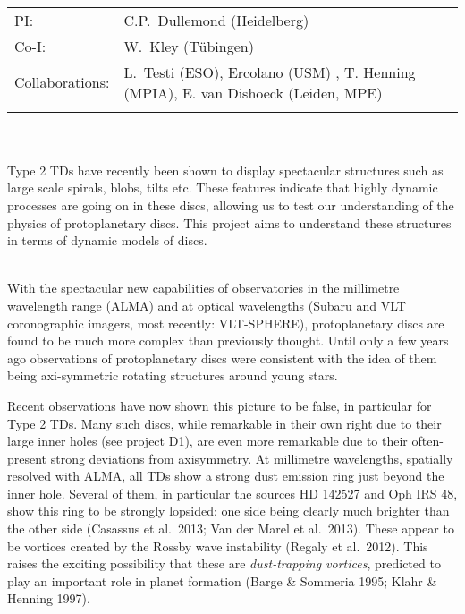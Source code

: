 \\
\begin{tabular}{ll}
{\textsf{PI:}}                 & C.P.~Dullemond (Heidelberg)\\
{\textsf{Co-I:}}               & W.~Kley (T\"ubingen)\\
{\textsf{Collaborations:}}     & L.~Testi (ESO), Ercolano (USM) , T. Henning (MPIA), E. van Dishoeck (Leiden, MPE) \\\\
\end{tabular}

\vspace{0.5em}
 \\

\vspace{0.5em}
\\
Type 2 TDs have recently been shown to display spectacular structures
such as large scale spirals, blobs, tilts etc. These features indicate that
highly dynamic processes are going on in these discs, allowing us to test
our understanding of the physics of protoplanetary discs. This project aims
to understand these structures in terms of dynamic models of discs.

\vspace{0.5em}
\\
With the spectacular new capabilities of observatories in the millimetre
wavelength range (ALMA) and at optical wavelengths (Subaru and VLT
coronographic imagers, most recently: VLT-SPHERE), protoplanetary discs are
found to be much more complex than previously thought. Until only a few
years ago observations of protoplanetary discs were consistent with the idea
of them being axi-symmetric rotating structures around young stars.  

Recent observations have now shown this picture to be false, in particular
for Type 2 TDs. Many such discs, while remarkable in their own right
due to their large inner holes (see project D1), are even more
remarkable due to their often-present strong deviations from axisymmetry. At
millimetre wavelengths, spatially resolved with ALMA, all TDs
show a strong dust emission ring just beyond the inner hole. Several of
them, in particular the sources HD 142527 and Oph IRS 48, show this ring to
be strongly lopsided: one side being clearly much brighter than the other
side (Casassus et al.~2013; Van der Marel et al.~2013). These appear to be
vortices created by the Rossby wave instability (Regaly et al.~2012). This
raises the exciting possibility that these are {\em dust-trapping vortices},
predicted to play an important role in planet formation (Barge \& Sommeria
1995; Klahr \& Henning 1997).

